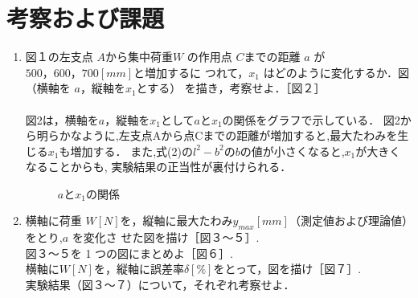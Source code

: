 \documentclass[a4paper,11pt]{jsarticle}
\begin{document}
\section{考察および課題}
\begin{enumerate}
  \item 図１の左支点 $A$から集中荷重$ W$ の作用点 $C $までの距離 $a$ が $500，600，700 [mm]$と増加するに
  つれて，$x_1$ はどのように変化するか．図（横軸を $a $，縦軸を$x_1$とする） を描き，考察せよ．［図２］\\
  \\
  \quad 図2は，横軸を$a$，縦軸を$x_1$として$a$と$x_1$の関係をグラフで示している．
  図2から明らかなように,左支点Aから点Cまでの距離が増加すると,最大たわみを生じる$x_1$も増加する．
  また,式(2)の$l^2-b^2$の$b$の値が小さくなると,$x_1$が大きくなることからも,
  実験結果の正当性が裏付けられる．
\clearpage
\begin{figure}[h]
  \centering
  \caption{$a$と$x_1$の関係}
\end{figure}
\clearpage
\item 横軸に荷重 $W [N] $を，縦軸に最大たわみ$ y_{max}[mm]$（測定値および理論値）をとり,$a$ を変化さ
せた図を描け［図３～５］.\\
図３～５を 1 つの図にまとめよ［図６］.\\
横軸に$ W [N]$を，縦軸に誤差率$ \delta [\%]$をとって，図を描け［図７］.\\
実験結果（図３～７）について，それぞれ考察せよ．\\
  

\end{enumerate}
\end{document}
